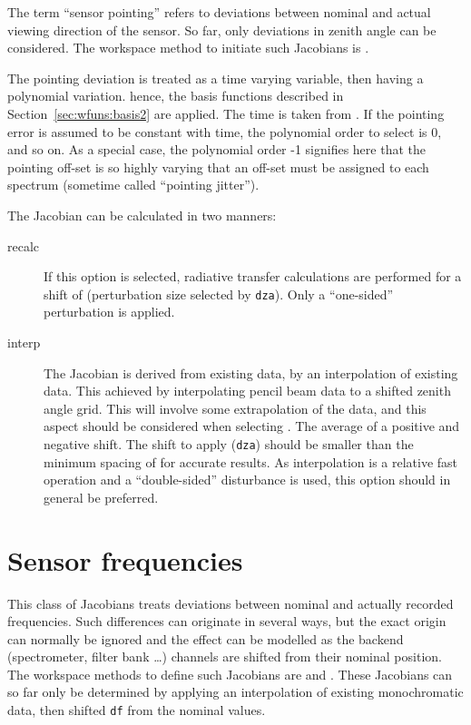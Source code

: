The term ``sensor pointing'' refers to deviations between nominal and
actual viewing direction of the sensor. So far, only deviations in zenith angle
can be considered. The workspace method to initiate such Jacobians is
.

The pointing deviation is treated as a time varying variable, then having a
polynomial variation. hence, the basis functions described in
Section~\ref{sec:wfuns:basis2} are applied. The time is taken from
. If the pointing error is assumed to be constant with
time, the polynomial order to select is 0, and so on. As a special case, the
polynomial order -1 signifies here that the pointing off-set is so highly
varying that an off-set must be assigned to each spectrum
(sometime called ``pointing jitter'').

The Jacobian can be calculated in two manners:
\begin{description}
\item[recalc] If this option is selected, radiative transfer calculations are
  performed for a shift of  (perturbation size selected
  by \verb|dza|). Only a ``one-sided'' perturbation is applied.
\item[interp] The Jacobian is derived from existing data, by an interpolation
  of existing data. This achieved by interpolating pencil beam data to a
  shifted zenith angle grid. This will involve some extrapolation of the data,
  and this aspect should be considered when selecting
  . The average of a positive and negative shift.
  The shift to apply (\verb|dza|) should be smaller than the minimum spacing of
   for accurate results. As interpolation is a
  relative fast operation and a ``double-sided'' disturbance is used, this
  option should in general be preferred.
\end{description}




\section{Sensor frequencies}
\label{sec:wfuns:sensorfreq}

This class of Jacobians treats deviations between nominal and actually recorded
frequencies. Such differences can originate in several ways, but the exact
origin can normally be ignored and the effect can be modelled as the backend
(spectrometer, filter bank \dots) channels are shifted from their nominal
position. The workspace methods to define such Jacobians are
 and . These
Jacobians can so far only be determined by applying an interpolation of existing
monochromatic data, then shifted \verb|df| from the nominal
values.

